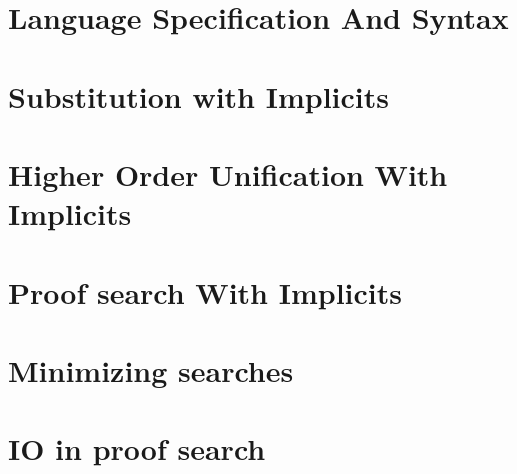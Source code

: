\section{Language Specification And Syntax}

\section{Substitution with Implicits}

\section{Higher Order Unification With Implicits}

\section{Proof search With Implicits}

\section{Minimizing searches}

\section{IO in proof search}
